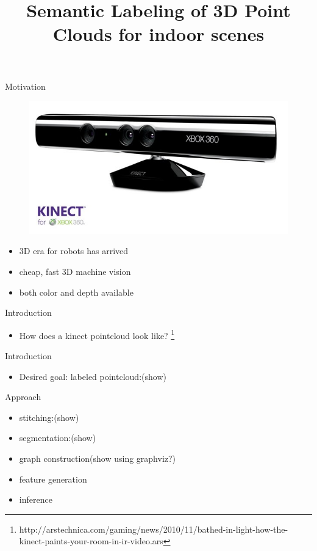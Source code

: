 \documentclass{beamer}
\title{Semantic Labeling of 3D Point Clouds for indoor scenes}
\begin{document}
\begin{frame}
\titlepage
\end{frame}

\begin{frame}{Motivation}
	\begin{figure}[t!]
		\includegraphics[width=.5\linewidth]{kinect.jpg}
	\end{figure}

	\begin{itemize}
		\item 3D era for robots has arrived 
		\item  cheap, fast 3D machine vision
		\item  both color and depth available
	\end{itemize}

\end{frame}

\begin{frame}{Introduction}
	\begin{itemize}
		\item How does a kinect pointcloud look like? \footnote{http://arstechnica.com/gaming/news/2010/11/bathed-in-light-how-the-kinect-paints-your-room-in-ir-video.ars}

	\end{itemize}
\end{frame}

\begin{frame}{Introduction}
	\begin{itemize}
		\item Desired goal: labeled pointcloud:(show)

	\end{itemize}
\end{frame}

\begin{frame}{Approach}
	\begin{itemize}
		\item stitching:(show)
		\item  segmentation:(show)
		\item  graph construction(show using graphviz?)
		\item  feature generation
		\item  inference
	\end{itemize}

\end{frame}
\end{document}
